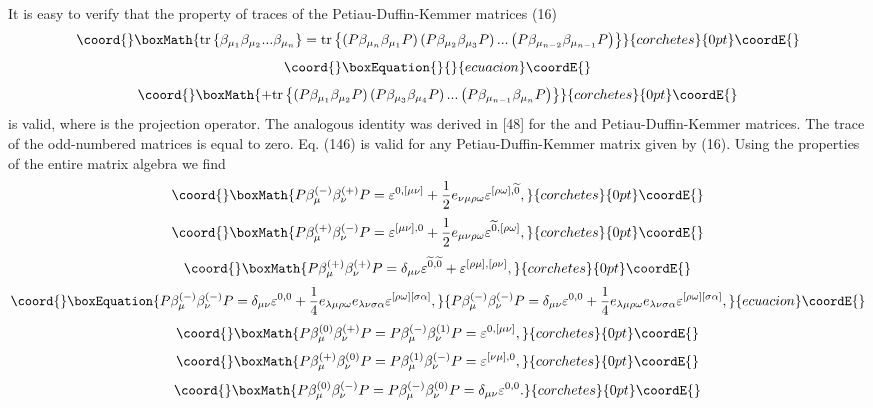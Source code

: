 \documentclass[a4paper,12pt]{article}
\begin{document}
It is easy to verify that the property of traces of the \coordHE{}
Petiau-Duffin-Kemmer matrices \myHighlight{$\beta _\mu ^{(\pm )}$}\coordHE{} (16)
\[\coord{}\boxMath{
\mbox{tr}\left\{ \beta _{\mu _1}\beta _{\mu _2}...\beta _{\mu
_n}\right\} = \mbox{tr}\left\{ \left( P\beta _{\mu _n}\beta _{\mu
_1}P\right) \left( P\beta _{\mu _2}\beta _{\mu _3}P\right)
...\left( P\beta _{\mu _{n-2}}\beta _{\mu _{n-1}}P\right) \right\}
}{corchetes}{0pt}\coordE{}\]
\vspace{-8mm}
\begin{equation}\coord{}\boxEquation{  \label{146}
}{  }{ecuacion}\coordE{}\end{equation}
\vspace{-8mm}
\[\coord{}\boxMath{
+\mbox{tr}\left\{ \left( P\beta _{\mu _1}\beta _{\mu _2}P\right)
\left( P\beta _{\mu _3}\beta _{\mu _4}P\right) ...\left( P\beta
_{\mu _{n-1}}\beta _{\mu _n}P\right) \right\}
}{corchetes}{0pt}\coordE{}\]
is valid, where \coordHE{} is the projection operator. The analogous identity was
derived in [48] for the \coordHE{} and \coordHE{}Petiau-Duffin-Kemmer matrices. The trace of the odd-numbered
matrices \myHighlight{$\beta _\mu ^{(\pm )}$}\coordHE{} is equal to zero. Eq. (146) is
valid for any Petiau-Duffin-Kemmer matrix given by (16). Using the
properties of the entire matrix algebra \coordHE{} we
find
\[\coord{}\boxMath{
P\beta _\mu ^{(-)}\beta _\nu ^{(+)}P=\varepsilon ^{0,[\mu \nu
]}+\frac 12e_{\nu \mu \rho \omega }\varepsilon ^{[\rho \omega
],\widetilde{0}} ,
}{corchetes}{0pt}\coordE{}\]
\[\coord{}\boxMath{
P\beta _\mu ^{(+)}\beta _\nu ^{(-)}P=\varepsilon ^{[\mu \nu
],0}+\frac 12e_{\mu \nu \rho \omega }\varepsilon
^{\widetilde{0},[\rho \omega ]} ,
}{corchetes}{0pt}\coordE{}\]
\[\coord{}\boxMath{
P\beta _\mu ^{(+)}\beta _\nu ^{(+)}P=\delta _{\mu \nu }\varepsilon
^{ \widetilde{0},\widetilde{0}}+\varepsilon ^{[\rho \mu ],[\rho
\nu ]} ,
}{corchetes}{0pt}\coordE{}\]
\begin{equation}\coord{}\boxEquation{
P\beta _\mu ^{(-)}\beta _\nu ^{(-)}P=\delta _{\mu \nu }\varepsilon
^{0,0}+\frac 14e_{\lambda \mu \rho \omega }e_{\lambda \nu \sigma
\alpha }\varepsilon ^{[\rho \omega ][\sigma \alpha ]} ,\label{147}
}{
P\beta _\mu ^{(-)}\beta _\nu ^{(-)}P=\delta _{\mu \nu }\varepsilon
^{0,0}+\frac 14e_{\lambda \mu \rho \omega }e_{\lambda \nu \sigma
\alpha }\varepsilon ^{[\rho \omega ][\sigma \alpha ]} ,}{ecuacion}\coordE{}\end{equation}
\[\coord{}\boxMath{
P\beta _\mu ^{(0)}\beta _\nu ^{(+)}P=P\beta _\mu ^{(-)}\beta _\nu
^{(1)}P=\varepsilon ^{0,[\mu \nu ]} ,
}{corchetes}{0pt}\coordE{}\]
\[\coord{}\boxMath{
P\beta _\mu ^{(+)}\beta _\nu ^{(0)}P=P\beta _\mu ^{(1)}\beta _\nu
^{(-)}P=\varepsilon ^{[\nu \mu ],0} ,
}{corchetes}{0pt}\coordE{}\]
\[\coord{}\boxMath{
P\beta _\mu ^{(0)}\beta _\nu ^{(-)}P=P\beta _\mu ^{(-)}\beta _\nu
^{(0)}P=\delta _{\mu \nu }\varepsilon ^{0,0} .
}{corchetes}{0pt}\coordE{}\]
\end{document}
